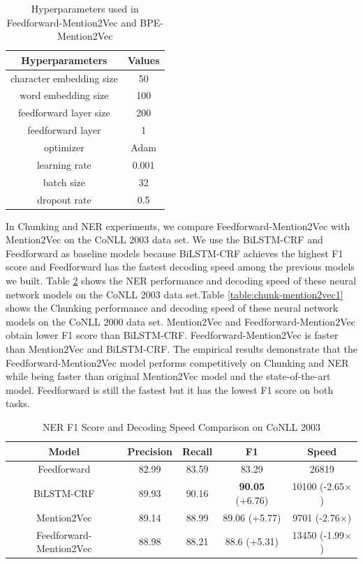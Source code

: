 \begin{table}[]
\centering
\caption{Hyperparameters used in Feedforward-Mention2Vec and BPE-Mention2Vec}
\label{table:hyperparameters3}
\begin{tabular}{|c|c|}
\hline
Hyperparameters & Values \\ \hline
character embedding size & 50 \\ \hline
word embedding size & 100 \\ \hline
feedforward layer size & 200 \\ \hline
feedforward layer & 1 \\ \hline
optimizer & Adam \\ \hline
learning rate & 0.001 \\ \hline
batch size & 32 \\ \hline
dropout rate & 0.5 \\ \hline
\end{tabular}
\end{table}

In Chunking and NER experiments, we compare Feedforward-Mention2Vec with Mention2Vec on the CoNLL 2003 data set. We use the BiLSTM-CRF and Feedforward as baseline models because BiLSTM-CRF achieves the highest F1 score and Feedforward has the fastest decoding speed among the previous models we built. Table \ref{table:ner-mention2vec1} shows the NER performance and decoding speed of these neural network models on the CoNLL 2003 data set.Table \ref{table:chunk-mention2vec1} shows the Chunking performance and decoding speed of these neural network models on the CoNLL 2000 data set. Mention2Vec and Feedforward-Mention2Vec obtain lower F1 score than BiLSTM-CRF. Feedforward-Mention2Vec is faster than Mention2Vec and BiLSTM-CRF. The empirical results demonstrate that the Feedforward-Mention2Vec model performs competitively on Chunking and NER while being faster than original Mention2Vec model and the state-of-the-art model. Feedforward is still the fastest but it has the lowest F1 score on both tasks.



\begin{table}[]
\centering
\caption{NER F1 Score and Decoding Speed Comparison on CoNLL 2003}
\label{table:ner-mention2vec1}
\begin{tabular}{|c|c|c|c|c|}
\hline
Model   & Precision & Recall & F1 & Speed \\ \hline
Feedforward &82.99 &83.59 &83.29 & 26819 \\ \hline
BiLSTM-CRF &89.93 &90.16 &\textbf{90.05} (+6.76) & 10100 (-2.65$\times$) \\ \hline
Mention2Vec &89.14 &88.99 &89.06 (+5.77) & 9701 (-2.76$\times$) \\ \hline
Feedforward-Mention2Vec &88.98 &88.21 &88.6 (+5.31) & 13450 (-1.99$\times$) \\ \hline
\end{tabular}
\end{table}

